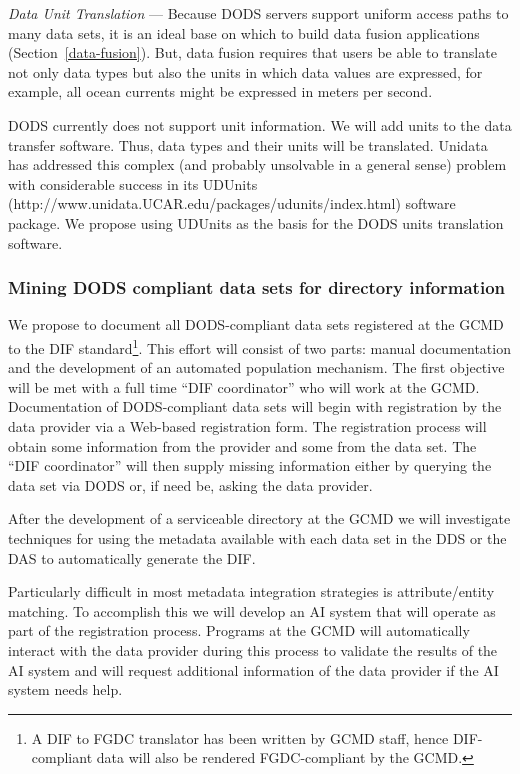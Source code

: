 \documentclass[12pt]{article}
\begin{document}
{\it Data Unit Translation} --- 
Because \ac{DODS} servers support uniform access paths to many data 
sets, it is an ideal base on which to build data fusion applications
(Section~\ref{data-fusion}). But, data fusion requires that users be 
able to translate not only data types but also the units in which 
data values are expressed, for example, all ocean currents might be 
expressed in meters per second.

\ac{DODS} currently does not support unit information. We will add
units to the data transfer software. Thus, data types and their units
will be translated. Unidata has addressed this complex (and probably
unsolvable in a general sense) problem with considerable success in its 
UDUnits (http://www.unidata.\ac{UCAR}.edu/packages/udunits/index.html)
software package. We propose using UDUnits as the basis for the 
\ac{DODS} units translation software.

\subsubsection{Mining \ac{DODS} compliant data sets for directory 
information}\label{locator}

We propose to document all \ac{DODS}-compliant data sets registered 
at the \ac{GCMD} to the \ac{DIF} standard\footnote{A DIF to FGDC 
translator has been written by GCMD staff, hence DIF-compliant data 
will also be rendered
FGDC-compliant by the GCMD.}. This effort will consist 
of two parts: manual documentation and the development of an automated 
population mechanism. The first objective will be met with a full 
time ``\ac{DIF} coordinator'' who will work at the \ac{GCMD}. 
Documentation of \ac{DODS}-compliant data sets will begin with
registration by the data provider via a Web-based registration
form. The registration process will obtain some information from
the provider and some from the data set. The ``\ac{DIF} coordinator''
will then supply missing information either by querying the data
set via \ac{DODS} or, if need be, asking the data provider.

After the development of a serviceable directory at the \ac{GCMD}
we will investigate techniques for using the metadata 
available with each data set in the \ac{DDS} or the
\ac{DAS} to automatically generate the \ac{DIF}.

Particularly difficult in most metadata integration strategies is 
attribute/entity matching. To accomplish this we will 
develop an \ac{AI} system that will operate as part of the 
registration process. Programs at the \ac{GCMD} will automatically 
interact with the data provider during this 
process to validate the results of the \ac{AI} system and will 
request additional information of the data provider if 
the \ac{AI} system needs help.
\end{document}
